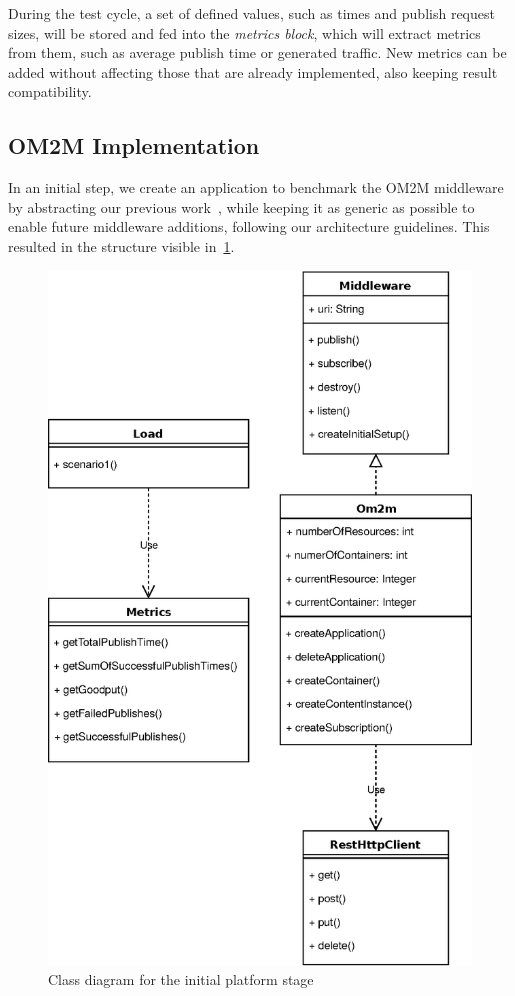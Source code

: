 \documentclass[conference]{IEEEtran}
\begin{document}
During the test cycle, a set of defined values, such as times and publish request sizes, will be stored and fed into the \textit{metrics block}, which will extract metrics from them, such as average publish time or generated traffic. New metrics can be added without affecting those that are already implemented, also keeping result compatibility. 

\subsection{OM2M Implementation}
In an initial step, we create an application to benchmark the OM2M middleware by abstracting our previous work~\cite{pereira_benchmarking_2018,cardoso_benchmarking_2017}, while keeping it as generic as possible to enable future middleware additions, following our architecture guidelines. This resulted in the structure visible in~\ref{fig:class_diagram_om2m}.

\begin{figure}[htbp!]
  \centering
  \includegraphics[width=\linewidth]{figures/class_diagram.eps}
  \caption{Class diagram for the initial platform stage}
  \label{fig:class_diagram_om2m}
\end{figure}
\end{document}
